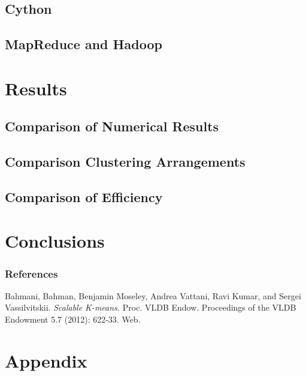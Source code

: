 \documentclass{article} %
\begin{document}
\subsection{Cython}

\subsection{MapReduce and Hadoop}

\section{Results}
\label{headings}

\subsection{Comparison of Numerical Results}

\subsection{Comparison Clustering Arrangements}

\subsection{Comparison of Efficiency}

\section{Conclusions}
\label{headings}

\clearpage
\newpage

\subsubsection*{References}

Bahmani, Bahman, Benjamin Moseley, Andrea Vattani, Ravi Kumar, and Sergei Vassilvitskii. \textit{Scalable K-means.} Proc. VLDB Endow. Proceedings of the VLDB Endowment 5.7 (2012): 622-33. Web.


\clearpage
\newpage

\section{Appendix}
\label{headings}
\end{document}
